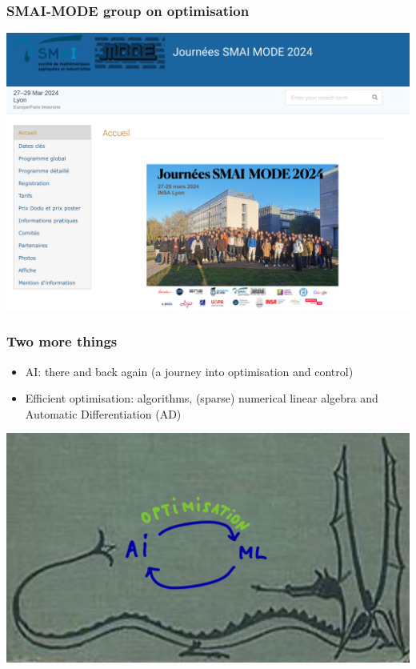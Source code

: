 \documentclass[9pt]{beamer}
\begin{document}
\begin{frame}

\frametitle{\bf SMAI-MODE group on optimisation}
\centering \includegraphics[width=.99\textwidth]{smai-mode}

\end{frame}

\begin{frame}
\frametitle{\bf Two more things}

\begin{itemize}
\item AI: there and back again (a journey into optimisation and control)
\item Efficient optimisation: algorithms, (sparse) numerical linear algebra and Automatic Differentiation (AD)
\end{itemize}

\centering \includegraphics[width=.5\textwidth]{there-and-back}

\end{frame}
\end{document}

